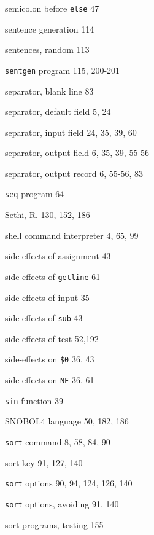 \begin{multicols}{3}
\hangindent=3pc  semicolon before \verb'else' 47

\hangindent=3pc  sentence generation 114

\hangindent=3pc  sentences, random 113

\hangindent=3pc  \verb'sentgen' program 115, 200-201

\hangindent=3pc  separator, blank line 83

\hangindent=3pc  separator, default field 5, 24

\hangindent=3pc  separator, input field 24, 35, 39, 60

\hangindent=3pc  separator, output field 6, 35, 39, 55-56

\hangindent=3pc  separator, output record 6, 55-56,  83

\hangindent=3pc  \verb'seq' program 64

\hangindent=3pc  Sethi, R. 130, 152, 186

\hangindent=3pc  shell command interpreter 4, 65, 99

\hangindent=3pc  side-effects of assignment 43

\hangindent=3pc  side-effects of \verb'getline' 61

\hangindent=3pc  side-effects of input 35

\hangindent=3pc  side-effects of \verb'sub' 43

\hangindent=3pc  side-effects of test 52,192

\hangindent=3pc  side-effects on \verb'$0' 36, 43

\hangindent=3pc  side-effects on \verb'NF' 36, 61

\hangindent=3pc  \verb'sin' function 39

\hangindent=3pc  SNOBOL4 language 50, 182, 186

\hangindent=3pc  \verb'sort' command 8, 58, 84, 90

\hangindent=3pc  sort key 91, 127, 140

\hangindent=3pc  \verb'sort' options 90, 94, 124, 126, 140

\hangindent=3pc  \verb'sort' options, avoiding 91, 140


\hangindent=3pc  sort programs, testing 155


\end{multicols}
